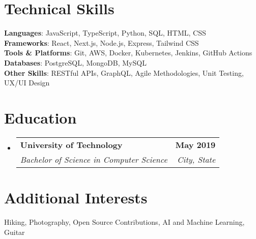 \documentclass[letterpaper,11pt]{article}
\makeatletter
\newcommand{\resumeSubheading}[4]{%
  \vspace{2pt}\item%
    \begin{tabular*}{\textwidth}[t]{@{\hskip 0pt}l@{\extracolsep{\fill}}r@{}}%
      \textbf{\normalsize #1} & \textbf{\normalsize #2} \\
      \textit{\small#3} & \textit{\small#4} \\
    \end{tabular*}%
}
\newenvironment{resumeSubHeadingList}{%
  \begin{itemize}[leftmargin=0.15in, label={}]%
}{%
  \end{itemize}%
}
\makeatother
\begin{document}
\section{Technical Skills}
 \begin{itemize}[leftmargin=0.15in, label={}]
    \small{\item{
     \textbf{Languages}{: JavaScript, TypeScript, Python, SQL, HTML, CSS} \\
     \textbf{Frameworks}{: React, Next.js, Node.js, Express, Tailwind CSS} \\
     \textbf{Tools \& Platforms}{: Git, AWS, Docker, Kubernetes, Jenkins, GitHub Actions} \\
     \textbf{Databases}{: PostgreSQL, MongoDB, MySQL} \\
     \textbf{Other Skills}{: RESTful APIs, GraphQL, Agile Methodologies, Unit Testing, UX/UI Design}
    }}
 \end{itemize}

\section{Education}
  \begin{resumeSubHeadingList}
    \resumeSubheading
      {University of Technology}{May 2019}
      {Bachelor of Science in Computer Science}{City, State}
  \end{resumeSubHeadingList}

\section{Additional Interests}
 \begin{itemize}[leftmargin=0.15in, label={}]
    \small{\item{
     Hiking, Photography, Open Source Contributions, AI and Machine Learning, Guitar
    }}
 \end{itemize}
\end{document}
